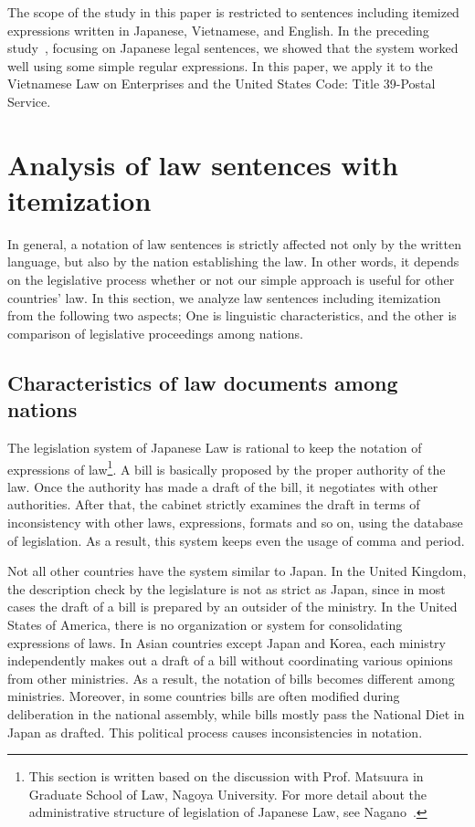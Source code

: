 \documentclass[english]{jnlp_1.4}
\begin{document}
The scope of the study in this paper is restricted to 
sentences including itemized expressions written in Japanese,
Vietnamese, and English.
In the preceding study~\cite{nakamura08jurisin_lnai}, focusing on Japanese
legal sentences, we showed that the system worked well
using some simple regular expressions.
In this paper, we apply it to the Vietnamese Law on Enterprises and the
United States Code: Title 39-Postal Service.



\section{Analysis of law sentences with itemization}

In general, a notation of law sentences is strictly affected not only by the written 
language, but also by the nation establishing the law.
In other words, it depends on the legislative process whether or not our simple 
approach is useful for other countries' law.
In this section, we analyze law sentences including itemization from the
following two aspects; One is linguistic characteristics,
and the other is comparison of legislative proceedings among nations.


\subsection{Characteristics of law documents among nations}

The legislation system of Japanese Law is rational to keep the notation
of expressions of law\footnote{
This section is written based on the discussion with Prof. Matsuura in
  Graduate School of Law, Nagoya University.
For more detail about the administrative structure of legislation of
Japanese Law, see Nagano~\cite{nagano05}.
}.
A bill is basically proposed by the proper authority 
of the law.  Once the authority has made a draft of the bill, it negotiates 
with other authorities.  After that, the cabinet strictly examines the 
draft in terms of inconsistency with other laws, expressions, formats and 
so on, using the database of legislation.  
As a result, this system keeps even the usage of comma and period.

Not all other countries have the system similar to Japan.  
In the United Kingdom, the description check by the legislature is
not as strict as Japan, since in most cases the draft of a bill is
prepared by an outsider of the ministry.  In the United States of America, 
there is no organization or system for consolidating expressions of laws.
In Asian countries except Japan and Korea, each ministry independently
makes out a draft of a bill without coordinating various opinions from other
ministries. As a result, the notation of bills becomes different among
ministries.  Moreover, in some countries bills are often modified
during deliberation in the national assembly, while bills mostly pass the
National Diet in Japan as drafted.  This political process causes 
inconsistencies in notation.
\end{document}
